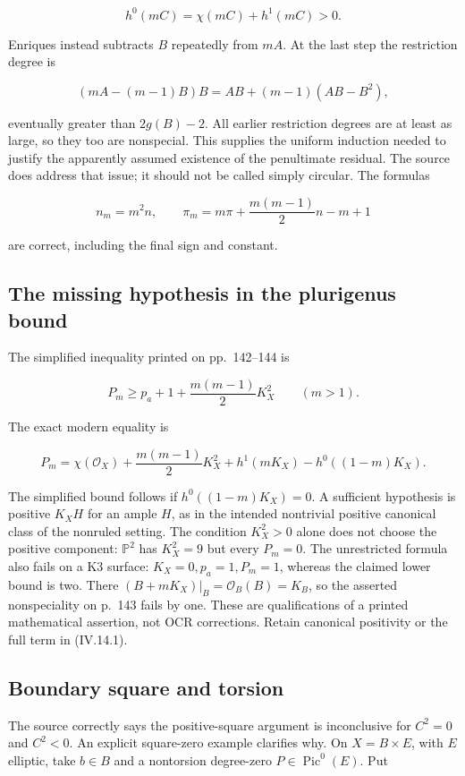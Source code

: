 \[
h^0(mC)=\chi(mC)+h^1(mC)>0.
\]

Enriques instead subtracts \(B\) repeatedly from \(mA\). At the last step the restriction degree is

\[
(mA-(m-1)B)B=AB+(m-1)(AB-B^2),
\]

eventually greater than \(2g(B)-2\). All earlier restriction degrees are at least as large, so they too are nonspecial. This supplies the uniform induction needed to justify the apparently assumed existence of the penultimate residual. The source does address that issue; it should not be called simply circular. The formulas

\[
n_m=m^2n,\qquad \pi_m=m\pi+\frac{m(m-1)}2n-m+1
\]

are correct, including the final sign and constant.

\subsection{The missing hypothesis in the plurigenus bound}

The simplified inequality printed on pp.~142--144 is

\[
P_m\ge p_a+1+\frac{m(m-1)}2K_X^2\qquad(m>1).
\]

The exact modern equality is

\[
\boxed{P_m=\chi(\mathcal O_X)+\frac{m(m-1)}2K_X^2+
h^1(mK_X)-h^0((1-m)K_X).}
\tag{IV.14.1}
\]

The simplified bound follows if \(h^0((1-m)K_X)=0\). A sufficient hypothesis is positive \(K_X H\) for an ample \(H\), as in the intended nontrivial positive canonical class of the nonruled setting. The condition \(K_X^2>0\) alone does not choose the positive component: \(\mathbb P^2\) has \(K_X^2=9\) but every \(P_m=0\). The unrestricted formula also fails on a K3 surface: \(K_X=0,p_a=1,P_m=1\), whereas the claimed lower bound is two. There \((B+mK_X)|_B=\mathcal O_B(B)=K_B\), so the asserted nonspeciality on p.~143 fails by one. These are qualifications of a printed mathematical assertion, not OCR corrections. Retain canonical positivity or the full term in (IV.14.1).

\subsection{Boundary square and torsion}

The source correctly says the positive-square argument is inconclusive for \(C^2=0\) and \(C^2<0\). An explicit square-zero example clarifies why. On \(X=B\times E\), with \(E\) elliptic, take \(b\in B\) and a nontorsion degree-zero \(P\in\operatorname{Pic}^0(E)\). Put


